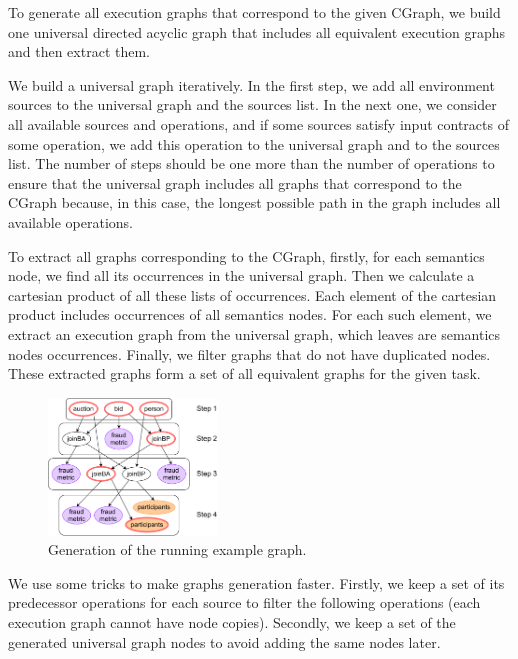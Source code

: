 To generate all execution graphs that correspond to the given CGraph, we build one universal directed acyclic graph that includes all equivalent execution graphs and then extract them.

We build a universal graph iteratively.
In the first step, we add all environment sources to the universal graph and the sources list.
In the next one, we consider all available sources and operations, and if some sources satisfy input contracts of some operation, we add this operation to the universal graph and to the sources list.
The number of steps should be one more than the number of operations to ensure that the universal graph includes all graphs that correspond to the CGraph because, in this case, the longest possible path in the graph includes all available operations.

To extract all graphs corresponding to the CGraph, firstly, for each semantics node, we find all its occurrences in the universal graph.
Then we calculate a cartesian product of all these lists of occurrences.
Each element of the cartesian product includes occurrences of all semantics nodes.
For each such element, we extract an execution graph from the universal graph, which leaves are semantics nodes occurrences.
Finally, we filter graphs that do not have duplicated nodes.
These extracted graphs form a set of all equivalent graphs for the given task.

\begin{figure}
    \flushright
    \includegraphics[width=0.4\textwidth]{images/generation}
    \caption{Generation of the running example graph.}
    \label{fig:gen}
\end{figure}

We use some tricks to make graphs generation faster.
Firstly, we keep a set of its predecessor operations for each source to filter the following operations (each execution graph cannot have node copies).
Secondly, we keep a set of the generated universal graph nodes to avoid adding the same nodes later.



